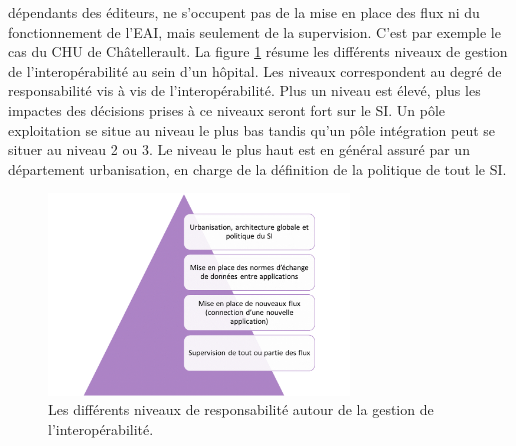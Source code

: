 			dépendants des éditeurs, ne s’occupent pas de la mise en place des flux ni
			du fonctionnement de l’EAI, mais seulement de la supervision. C’est par
			exemple le cas du CHU de Châtellerault.\newline
			La figure \ref{orga_interop} résume les différents niveaux de gestion de
			l’interopérabilité au sein d’un hôpital. Les niveaux correspondent au degré
			de responsabilité vis à vis de l'interopérabilité. Plus un niveau est élevé,
			plus les impactes des décisions prises à ce niveaux seront fort sur le SI. Un
			pôle exploitation se situe au niveau le plus bas tandis qu’un pôle
			intégration peut se situer au niveau 2 ou 3. Le niveau le plus haut est en
			général assuré par un département urbanisation, en charge de la définition
			de la politique de tout le SI.
			\begin{figure}[H]
				\centering
				\includegraphics[width=8cm]{../img/si_1.png}
				\caption{\label{orga_interop} Les différents niveaux de responsabilité
				autour de la gestion de l'interopérabilité.}
			\end{figure}
			
